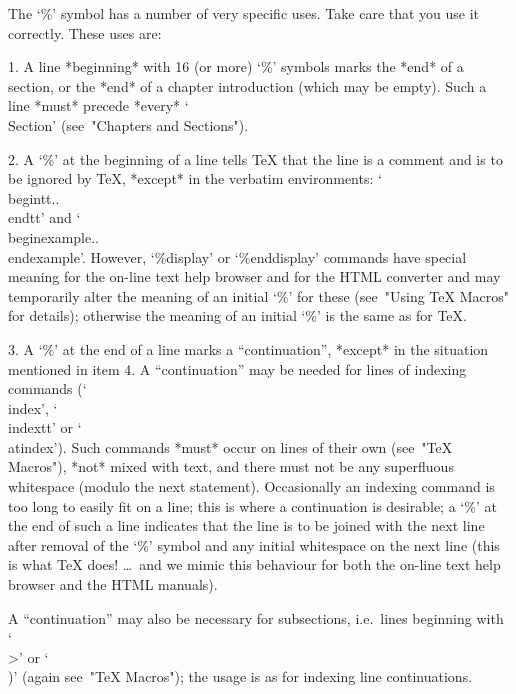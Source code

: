 

\indextt{\%}
The `\%' symbol has a number of very specific uses. Take  care  that  you
use it correctly. These uses are:
\beginlist
\item{1.}
A line *beginning* with 16 (or more) `\%' symbols marks the  *end*  of  a
section, or the *end* of a chapter introduction  (which  may  be  empty).
Such  a  line  *must*  precede  *every*  `\\Section'  (see~"Chapters  and
Sections").

\item{2.}
A `\%' at the beginning of a line tells {\TeX} that the line is a comment
and is to be ignored by {\TeX}, *except* in  the  verbatim  environments:
`\\begintt..\\endtt'   and    `\\beginexample..\\endexample'.    However,
`\%display' or `\%enddisplay'  commands  have  special  meaning  for  the
on-line text help browser and for the HTML converter and may  temporarily
alter the meaning of an initial `\%' for these  (see~"Using  TeX  Macros"
for details); otherwise the meaning of an initial `\%' is the same as for
{\TeX}.

\item{3.}
A `\%' at the end of a line marks a  ``continuation'',  *except*  in  the
situation mentioned in item 4. A ``continuation'' may be needed for lines
of  indexing  commands  (`\\index',  `\\indextt'  or  `\\atindex').  Such
commands *must* occur on lines of their  own  (see~"TeX  Macros"),  *not*
mixed with text, and there must not be any superfluous whitespace (modulo
the next statement). Occasionally an indexing  command  is  too  long  to
easily fit on a line; this is where a continuation is desirable;  a  `\%'
at the end of such a line indicates that the line is to  be  joined  with
the next line after removal of the `\%' symbol and any initial whitespace
on the next line (this is what  {\TeX}  does!  \dots~and  we  mimic  this
behaviour for both the on-line text help browser and the HTML manuals).

A ``continuation'' may also  be  necessary  for  subsections,  i.e.~lines
beginning with `\\>' or `\\)' (again see~"TeX Macros"); the usage  is  as
for indexing line continuations.

